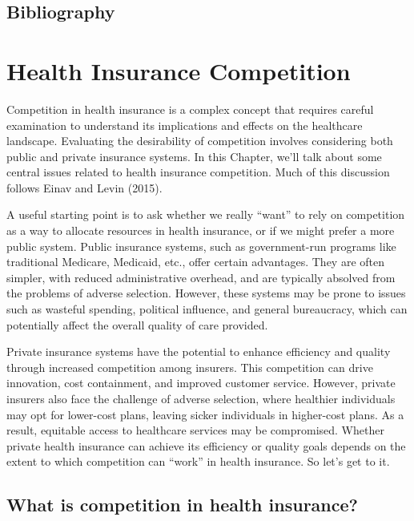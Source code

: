 \documentclass[
  letterpaper,
  DIV=11,
  numbers=noendperiod]{scrreport}
\theoremstyle{definition}
\theoremstyle{remark}
\begin{document}
\hypertarget{bibliography-1}{%
\section*{Bibliography}\label{bibliography-1}}


\hypertarget{health-insurance-competition}{%
\chapter{Health Insurance
Competition}\label{health-insurance-competition}}

Competition in health insurance is a complex concept that requires
careful examination to understand its implications and effects on the
healthcare landscape. Evaluating the desirability of competition
involves considering both public and private insurance systems. In this
Chapter, we'll talk about some central issues related to health
insurance competition. Much of this discussion follows Einav and Levin
(2015).

A useful starting point is to ask whether we really ``want'' to rely on
competition as a way to allocate resources in health insurance, or if we
might prefer a more public system. Public insurance systems, such as
government-run programs like traditional Medicare, Medicaid, etc., offer
certain advantages. They are often simpler, with reduced administrative
overhead, and are typically absolved from the problems of adverse
selection. However, these systems may be prone to issues such as
wasteful spending, political influence, and general bureaucracy, which
can potentially affect the overall quality of care provided.

Private insurance systems have the potential to enhance efficiency and
quality through increased competition among insurers. This competition
can drive innovation, cost containment, and improved customer service.
However, private insurers also face the challenge of adverse selection,
where healthier individuals may opt for lower-cost plans, leaving sicker
individuals in higher-cost plans. As a result, equitable access to
healthcare services may be compromised. Whether private health insurance
can achieve its efficiency or quality goals depends on the extent to
which competition can ``work'' in health insurance. So let's get to it.

\hypertarget{what-is-competition-in-health-insurance}{%
\section{What is competition in health
insurance?}\label{what-is-competition-in-health-insurance}}
\end{document}
